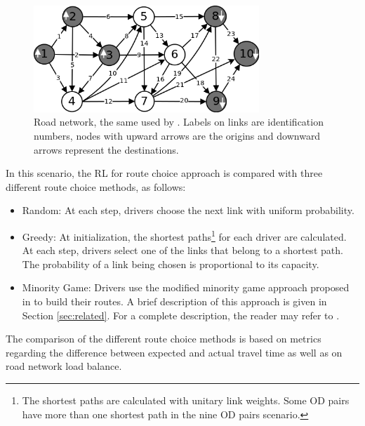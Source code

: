 \documentclass{RITA}
\begin{document}

\begin{figure}[ht]
    \centerline{\includegraphics[width=8.5cm]{img/roadnetwork.png}}
    \caption{Road network, the same used by \cite{Galib&Moser2011}. Labels on links are identification numbers, nodes with upward arrows are the origins and downward arrows represent the destinations.}
    \label{fig:roadnetwork}
\end{figure}

In this scenario, the RL for route choice approach is compared with three different route choice methods, as follows:

\begin{itemize}
  \item Random: At each step, drivers choose the next link with uniform probability.
  \item Greedy: At initialization, the shortest paths\footnote{The shortest paths are calculated with unitary link weights. Some OD pairs have more than one shortest path in the nine OD pairs scenario.} for each driver are calculated. At each step, drivers select one of the links that belong to a shortest path. The probability of a link being chosen is proportional to its capacity. 
  \item Minority Game: Drivers use the modified minority game approach proposed in \cite{Galib&Moser2011} to build their routes. A brief description of this approach is given in Section \ref{sec:related}. For a complete description, the reader may refer to \cite{Galib&Moser2011}.
\end{itemize}

The comparison of the different route choice methods is based on metrics regarding the difference between expected and actual travel time as well as on road network load balance.
\end{document}
